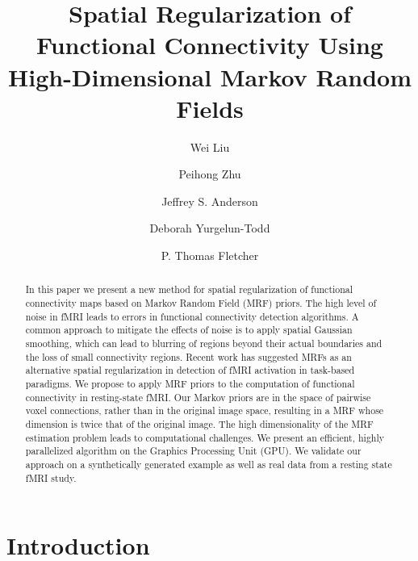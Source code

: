 \documentclass[runningheads,a4paper]{llncs}
\begin{document}
\mainmatter %


\title{Spatial Regularization of Functional Connectivity Using
  High-Dimensional Markov Random Fields}



\author{Wei Liu \and Peihong Zhu \and Jeffrey
  S. Anderson \and Deborah Yurgelun-Todd \and P. Thomas
  Fletcher}



 
\maketitle

\begin{abstract}
In this paper we present a new method for spatial regularization of functional
connectivity maps based on Markov Random Field (MRF) priors. The high level of
noise in fMRI leads to errors in functional connectivity detection algorithms. A
common approach to mitigate the effects of noise is to apply spatial Gaussian
smoothing, which can lead to blurring of regions beyond their actual boundaries
and the loss of small connectivity regions. Recent work has suggested MRFs as an
alternative spatial regularization in detection of fMRI activation in task-based
paradigms. We propose to apply MRF priors to the computation of functional
connectivity in resting-state fMRI. Our Markov priors are in the space of
pairwise voxel connections, rather than in the original image space, resulting
in a MRF whose dimension is twice that of the original image. The high
dimensionality of the MRF estimation problem leads to computational
challenges. We present an efficient, highly parallelized algorithm on the
Graphics Processing Unit (GPU). We validate our approach on a synthetically
generated example as well as real data from a resting state fMRI study.
\end{abstract}
 
\section{Introduction}
\end{document}
